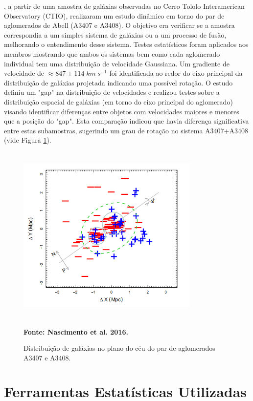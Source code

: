 , a partir de uma amostra de galáxias observadas no Cerro Tololo Interamerican Observatory (CTIO), realizaram um estudo dinâmico em torno do par de aglomerados de Abell (A3407 e A3408). O objetivo era verificar se a amostra correspondia a um simples sistema de galáxias ou a um processo de fusão, melhorando o entendimento desse sistema. Testes estatísticos foram aplicados aos membros mostrando que ambos os sistemas bem como cada aglomerado individual tem uma distribuição de velocidade Gaussiana. Um gradiente de velocidade de $\approx 847 \pm 114\; {km~s^{-1}}$ foi identificada ao redor do eixo principal da distribuição de galáxias projetada indicando uma possível rotação. 
O estudo definiu um "gap" na distribuição de velocidades e realizou testes sobre a distribuição espacial de galáxias (em torno do eixo principal do aglomerado) visando identificar diferenças entre objetos com velocidades maiores e menores que a posição do "gap". Esta comparação indicou que havia diferença significativa entre estas subamostras, sugerindo um grau de rotação no sistema A3407+A3408 (vide Figura \ref{fig3}).

\begin{figure}[H] %
\vspace{-2pt}
\begin{center}
\includegraphics[height=9cm,width=9cm]{04-figuras/nascimento.png}%
\caption{Distribuição de galáxias no plano do céu do par de aglomerados A3407 e A3408.}
 \textbf{Fonte: Nascimento et al. 2016.}
\label{fig3}%
\end{center}
\end{figure}

\chapter{Ferramentas Estatísticas Utilizadas}
